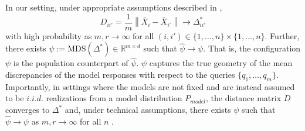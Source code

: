 In our setting, under appropriate assumptions described in \citep{aranyak},
\begin{equation}
    D_{i i'}=
    \frac{1}{m}
    \left\lVert 
\bar{X}_i-\bar{X}_{i'}
    \right\rVert
    \to 
    \Delta_{i i'}^{*}
\end{equation}
with high probability
as $m,r \to \infty$ for all $ (i, i') \in \{1, \hdots, n\} \times \{1, \hdots, n\} $.
Further, there exists $ \psi := \text{MDS}(\Delta^{*}) \in \mathbb{R}^{m \times d} $ such that $ \widehat{\psi} \to \psi $. 
That is, the configuration $ \psi $ is the population counterpart of $ \widehat{\psi} $. $ \psi $ captures the true geometry of the mean discrepancies of the model responses with respect to the queries  $ \{q_1,\hdots, q_m \} $.
Importantly, in settings where the models are not fixed and are instead assumed to be $ i.i.d. $ realizations from a model distribution $ P_{model} $, the distance matrix $ D $ converges to $ \Delta^{*} $ and, under technical assumptions, there exists $ \psi $ such that $ \widehat{\psi} \to \psi $ as $ m, r \to \infty $ for all $n$ \citep{aranyak}.



